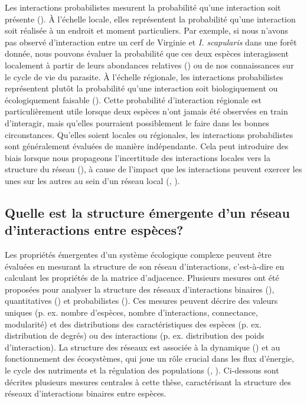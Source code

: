 Les interactions probabilistes mesurent la probabilité qu'une interaction soit
présente (\cite{Poisot2016Structure}). À l'échelle locale, elles représentent la
probabilité qu'une interaction soit réalisée à un endroit et moment
particuliers. Par exemple, si nous n'avons pas observé d'interaction entre un
cerf de Virginie et \textit{I. scapularis} dans une forêt donnée, nous pouvons
évaluer la probabilité que ces deux espèces interagissent localement à partir de
leurs abondances relatives (\cite{Canard2014Empirical}) ou de nos connaissances
sur le cycle de vie du parasite. À l'échelle régionale, les interactions
probabilistes représentent plutôt la probabilité qu'une interaction soit
biologiquement ou écologiquement faisable (\cite{Strydom2023Grapha}). Cette
probabilité d'interaction régionale est particulièrement utile lorsque deux
espèces n'ont jamais été observées en train d'interagir, mais qu'elles
pourraient possiblement le faire dans les bonnes circonstances. Qu'elles soient
locales ou régionales, les interactions probabilistes sont généralement évaluées
de manière indépendante. Cela peut introduire des biais lorsque nous propageons
l'incertitude des interactions locales vers la structure du réseau
(\cite{Poisot2016Structure}), à cause de l'impact que les interactions peuvent
exercer les unes sur les autres au sein d'un réseau local
(\cite{Golubski2011Modifying}, \cite{Ims2013Indirect}).


\subsection{Quelle est la structure émergente d'un réseau d'interactions entre espèces?} 

Les propriétés émergentes d'un système écologique complexe peuvent être évaluées
en mesurant la structure de son réseau d'interactions, c'est-à-dire en calculant
les propriétés de la matrice d'adjacence. Plusieurs mesures ont été proposées
pour analyser la structure des réseaux d'interactions binaires
(\cite{Delmas2019Analysing}), quantitatives (\cite{Bersier2002Quantitative}) et
probabilistes (\cite{Poisot2016Structure}). Ces mesures peuvent décrire des
valeurs uniques (p. ex. nombre d'espèces, nombre d'interactions, connectance,
modularité) et des distributions des caractéristiques des espèces (p. ex.
distribution de degrés) ou des interactions (p. ex. distribution des poids
d'interaction). La structure des réseaux est associée à la dynamique
(\cite{Pascual2006Ecologicala}) et au fonctionnement des écosystèmes, qui joue
un rôle crucial dans les flux d'énergie, le cycle des nutriments et la
régulation des populations (\cite{McCann2011Food}, \cite{Thompson2012Food}).
Ci-dessous sont décrites plusieurs mesures centrales à cette thèse,
caractérisant la structure des réseaux d'interactions binaires entre espèces.


